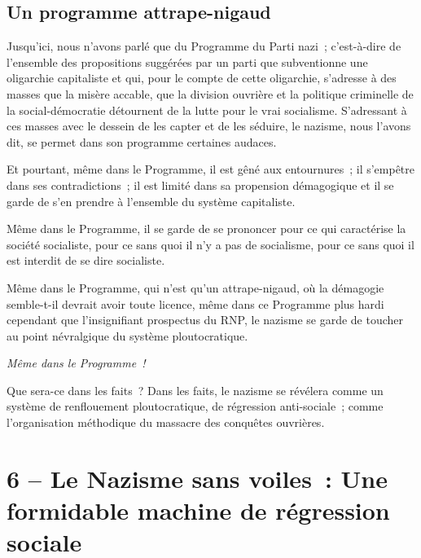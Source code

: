 \documentclass[french,twoside]{book} %
\newcommand\chapteropen{} %
\newcommand\chapterclose{} %
\begin{document}
\section[Un programme attrape-nigaud]{Un programme attrape-nigaud}
\noindent Jusqu’ici, nous n’avons parlé que du Programme du Parti nazi ; c’est-à-dire de l’ensemble des propositions suggérées par un parti que subventionne une oligarchie capitaliste et qui, pour le compte de cette oligarchie, s’adresse à des masses que la misère accable, que la division ouvrière et la politique criminelle de la social-démocratie détournent de la lutte pour le vrai socialisme. S’adressant à ces masses avec le dessein de les capter et de les séduire, le nazisme, nous l’avons dit, se permet dans son programme certaines audaces.\par
Et pourtant, même dans le Programme, il est gêné aux entournures ; il s’empêtre dans ses contradictions ; il est limité dans sa propension démagogique et il se garde de s’en prendre à l’ensemble du système capitaliste.\par
Même dans le Programme, il se garde de se prononcer pour ce qui caractérise la société socialiste, pour ce sans quoi il n’y a pas de socialisme, pour ce sans quoi il est interdit de se dire socialiste.\par
Même dans le Programme, qui n’est qu’un attrape-nigaud, où la démagogie semble-t-il devrait avoir toute licence, même dans ce Programme plus hardi cependant que l’insignifiant prospectus du RNP, le nazisme se garde de toucher au point névralgique du système ploutocratique.\par
{\itshape Même dans le Programme !}\par
Que sera-ce dans les faits ? Dans les faits, le nazisme se révélera comme un système de renflouement ploutocratique, de régression anti-sociale ; comme l’organisation méthodique du massacre des conquêtes ouvrières.
\chapterclose


\chapteropen
\chapter[6 – Le Nazisme sans voiles : Une formidable machine de régression sociale]{6 – Le Nazisme sans voiles : Une formidable machine de régression sociale}\renewcommand{\leftmark}{6 – Le Nazisme sans voiles : Une formidable machine de régression sociale}
\end{document}
